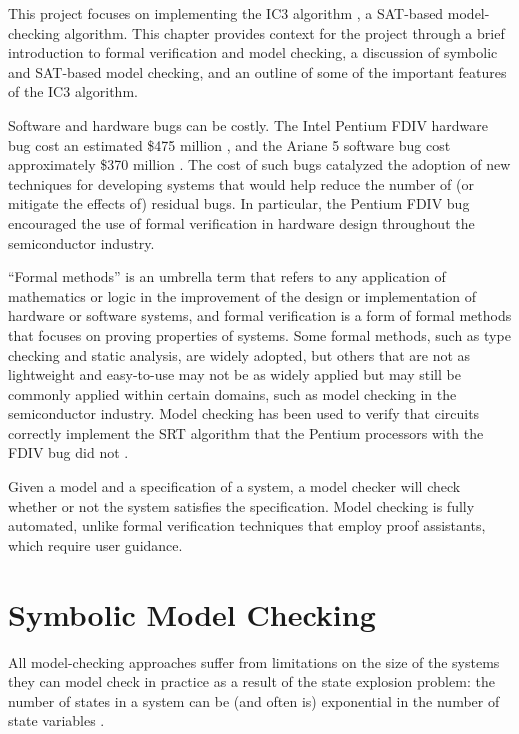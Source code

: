 \documentclass[12pt,a4paper,twoside,openright]{report}
\begin{document}
This project focuses on implementing the IC3 algorithm
\cite{bradley11}, a SAT-based model-checking
algorithm.
This chapter provides context for the project through a
brief introduction to formal verification and model checking,
a discussion of symbolic and SAT-based model checking,
and an outline of some of the important features of the IC3 algorithm.

Software and hardware bugs can be costly. The Intel Pentium FDIV hardware bug cost an
estimated \$475 million \cite{pratt95}, and the Ariane 5 software bug cost
approximately \$370 million \cite{dowson97}.
The cost of such bugs catalyzed the adoption of new techniques for developing systems
that would help reduce the number of (or mitigate the effects of) residual bugs.
In particular, the Pentium FDIV bug encouraged the use of formal verification in
hardware design throughout the semiconductor industry.

``Formal methods'' is an umbrella term that refers to any application of mathematics or logic
in the improvement of the design or implementation of hardware or software systems,
and formal verification is a form of formal methods that focuses on proving
properties of systems.
Some formal methods, such as type checking and static analysis, are widely
adopted, but others that are not as lightweight and easy-to-use
may not be as widely applied but may still be commonly applied within certain
domains, such as model checking in the semiconductor industry.
Model checking has been used to verify that circuits correctly implement the SRT
algorithm that the Pentium processors with the FDIV bug did not \cite{clarke96}.

Given a model and a specification of a system, a model checker will check whether or
not the system satisfies the specification.
Model checking is fully automated, unlike formal verification techniques that employ
proof assistants, which require user guidance.

\section{Symbolic Model Checking}

All model-checking approaches suffer from limitations on the size
of the systems they can model check in practice as a result of
the state explosion problem: the number of
states in a system can be (and often is) exponential in the
number of state variables \cite{clarke12}. 
\end{document}
